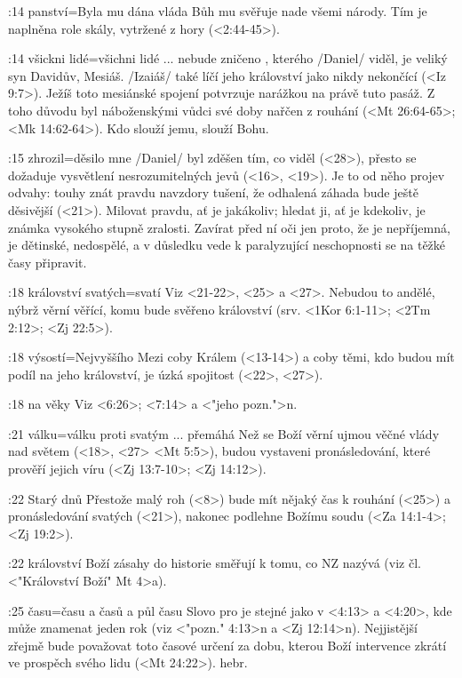 :14 {panství}={Byla mu dána vláda} Bůh mu svěřuje  nade všemi národy. Tím je naplněna role skály, vytržené z hory (<2:44-45>).

:14 {všickni lidé}={všichni lidé ... nebude zničeno} , kterého \x/Daniel/ viděl, je veliký syn Davidův, Mesiáš. \x/Izaiáš/ také líčí jeho království jako nikdy nekončící  (<Iz 9:7>). Ježíš toto mesiánské spojení potvrzuje narážkou na právě tuto pasáž. Z toho důvodu byl náboženskými vůdci své doby nařčen z rouhání (<Mt 26:64-65>; <Mk 14:62-64>). Kdo slouží jemu, slouží Bohu.

:15 {zhrozil}={děsilo mne} \x/Daniel/ byl zděšen tím, co viděl (<28>), přesto se dožaduje vysvětlení nesrozumitelných jevů (<16>, <19>). Je to od něho projev odvahy: touhy znát pravdu navzdory tušení, že odhalená záhada bude ještě děsivější (<21>). Milovat pravdu, ať je jakákoliv; hledat ji, ať je kdekoliv, je známka vysokého stupně zralosti. Zavírat před ní oči jen proto, že je nepříjemná, je dětinské, nedospělé, a v důsledku vede k paralyzující neschopnosti se na těžké časy připravit. 

:18 {království svatých}={svatí}  Viz <21-22>, <25> a <27>. Nebudou to andělé, nýbrž věrní věřící, komu bude svěřeno království (srv. <1Kor 6:1-11>; <2Tm 2:12>; <Zj 22:5>). 

:18 {výsostí}={Nejvyššího} Mezi  coby Králem (<13-14>) a  coby těmi, kdo budou mít podíl na jeho království, je úzká spojitost (<22>, <27>).

:18 {na věky}  Viz <6:26>;  <7:14> a <"jeho pozn.">n.

:21 {válku}={válku proti svatým ... přemáhá} Než se Boží věrní ujmou věčné vlády nad světem  (<18>, <27> <Mt 5:5>), budou vystaveni pronásledování, které prověří jejich víru  (<Zj 13:7-10>; <Zj 14:12>).

:22 {Starý dnů} Přestože malý roh  (<8>) bude mít nějaký čas k rouhání (<25>) a pronásledování svatých (<21>), nakonec podlehne Božímu soudu (<Za 14:1-4>; <Zj 19:2>).

:22 {království} Boží zásahy do historie směřují k tomu, co NZ nazývá   (viz čl. <"Království Boží" Mt 4>a).

:25 {času}={času a časů a půl času} Slovo pro  je stejné jako v <4:13> a <4:20>, kde může znamenat jeden rok (viz <"pozn." 4:13>n a <Zj 12:14>n). Nejjistější zřejmě bude považovat toto časové určení za dobu, kterou  Boží intervence zkrátí ve prospěch svého lidu (<Mt 24:22>).
\dopsat hebr.


